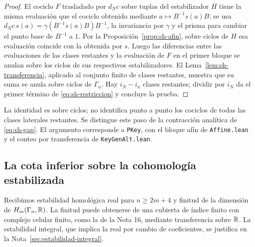 \begin{proof}
El cociclo $F$ trasladado por $d_Nc$ sobre tuplas del estabilizador $H$ tiene la misma evaluación que el cociclo obtenido mediante $a\mapsto B^{-1}s(a)B$: se usa $d_Nc\,s(a)=\gamma(B^{-1}s(a)B)B^{-1}$, la invariancia por $\gamma$ y el prisma para cambiar el punto base de $B^{-1}$ a $1$. Por la Proposición~\ref{prop:sh-afin}, sobre ciclos de $H$ esa evaluación coincide con la obtenida por $s$. Luego las diferencias entre las evaluaciones de las clases restantes y la evaluación de $F$ en el primer bloque se anulan sobre los ciclos de sus respectivos estabilizadores. El Lema~\ref{lem:sh-transferencia}, aplicado al conjunto finito de clases restantes, muestra que su suma se anula sobre ciclos de $\Gamma_n$. Hay $i_N-i_n$ clases restantes; dividir por $i_N$ da el primer término de \eqref{eq:sh-restriccion} y concluye la prueba.
\end{proof}

La identidad es sobre ciclos; no identifica punto a punto los cociclos de todas las clases laterales restantes. Se distingue este paso de la contracción analítica de \eqref{eq:sh-gap}. El argumento corresponde a \texttt{PKey}, con el bloque afín de \texttt{Affine.lean} y el conteo por transferencia de \texttt{KeyGenAlt.lean}.

\subsection{La cota inferior sobre la cohomología estabilizada}

Recibimos estabilidad homológica real para $n\ge2m+4$ y finitud de la dimensión de $H_m(\Gamma_n,\mathbb{R})$. La finitud puede obtenerse de una cubierta de índice finito con complejo celular finito, como la de la Nota 16, mediante transferencia sobre $\mathbb{R}$. La estabilidad integral, que implica la real por cambio de coeficientes, se justifica en la Nota~\ref{sec:estabilidad-integral}.

